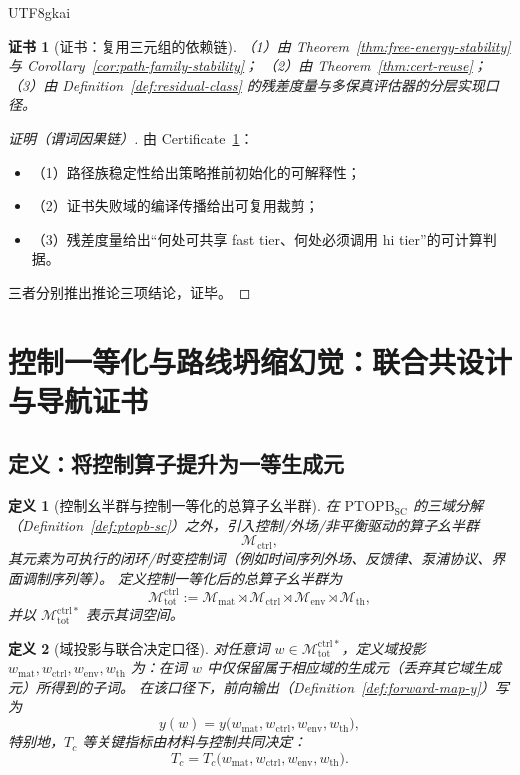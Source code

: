 \documentclass[12pt]{article}
\newtheorem{definition}{定义}[section]
\newtheorem{certificate}{证书}[section]
\newcommand{\PTOPB}{\ensuremath{\mathrm{PTOPB}}}
\begin{document}
\begin{CJK*}{UTF8}{gkai}
\begin{certificate}[证书：复用三元组的依赖链]
\label{cert:triple-reuse-deps}
（1）由 Theorem~\ref{thm:free-energy-stability} 与 Corollary~\ref{cor:path-family-stability}；
（2）由 Theorem~\ref{thm:cert-reuse}；
（3）由 Definition~\ref{def:residual-class} 的残差度量与多保真评估器的分层实现口径。
\end{certificate}

\begin{proof}[证明（谓词因果链）]
由 Certificate~\ref{cert:triple-reuse-deps}：
\begin{itemize}
  \item（1）路径族稳定性给出策略推前初始化的可解释性；
  \item（2）证书失败域的编译传播给出可复用裁剪；
  \item（3）残差度量给出“何处可共享 fast tier、何处必须调用 hi tier”的可计算判据。
\end{itemize}
三者分别推出推论三项结论，证毕。
\end{proof}

\clearpage
\section{控制一等化与路线坍缩幻觉：联合共设计与导航证书}
\label{sec:control-route-hallucination}

\subsection{定义：将控制算子提升为一等生成元}

\begin{definition}[控制幺半群与控制一等化的总算子幺半群]
\label{def:ctrl-first-class}
在 \PTOPB$_{\mathrm{SC}}$ 的三域分解（Definition~\ref{def:ptopb-sc}）之外，引入控制/外场/非平衡驱动的算子幺半群
\[
\mathcal{M}_{\mathrm{ctrl}},
\]
其元素为可执行的闭环/时变控制词（例如时间序列外场、反馈律、泵浦协议、界面调制序列等）。
定义控制一等化后的总算子幺半群为
\[
\mathcal{M}_{\mathrm{tot}}^{\mathrm{ctrl}}
:=
\mathcal{M}_{\mathrm{mat}}
\rtimes
\mathcal{M}_{\mathrm{ctrl}}
\rtimes
\mathcal{M}_{\mathrm{env}}
\rtimes
\mathcal{M}_{\mathrm{th}},
\]
并以 $\mathcal{M}_{\mathrm{tot}}^{\mathrm{ctrl}\ast}$ 表示其词空间。
\end{definition}

\begin{definition}[域投影与联合决定口径]
\label{def:domain-projection}
对任意词 $w\in \mathcal{M}_{\mathrm{tot}}^{\mathrm{ctrl}\ast}$，定义域投影 $w_{\mathrm{mat}},w_{\mathrm{ctrl}},w_{\mathrm{env}},
  w_{\mathrm{th}}$ 为：在词 $w$ 中仅保留属于相应域的生成元（丢弃其它域生成元）所得到的子词。
在该口径下，前向输出（Definition~\ref{def:forward-map-y}）写为
\[
y(w)=y\bigl(w_{\mathrm{mat}},w_{\mathrm{ctrl}},w_{\mathrm{env}},w_{\mathrm{th}}\bigr),
\]
特别地，$T_c$ 等关键指标由材料与控制共同决定：
\[
T_c=T_c\bigl(w_{\mathrm{mat}},w_{\mathrm{ctrl}},w_{\mathrm{env}},w_{\mathrm{th}}\bigr).
\]
\end{definition}


\end{CJK*}
\end{document}
